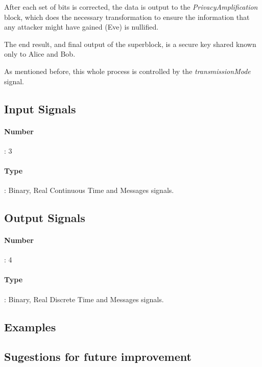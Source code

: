 After each set of bits is corrected, the data is output to the 
\textit{PrivacyAmplification} block, which does the necessary transformation to 
ensure the information that any attacker might have gained (Eve) is nullified.

The end result, and final output of the superblock, is a secure key 
shared known only to Alice and Bob.

As mentioned before, this whole process is controlled by the 
\textit{transmissionMode} signal.

\subsection*{Input Signals}
\paragraph*{Number}: 3
\paragraph*{Type}: Binary, Real Continuous Time and Messages signals.

\subsection*{Output Signals}
\paragraph*{Number}: 4
\paragraph*{Type}: Binary, Real Discrete Time and Messages signals.

\subsection*{Examples}


\subsection*{Sugestions for future improvement}












